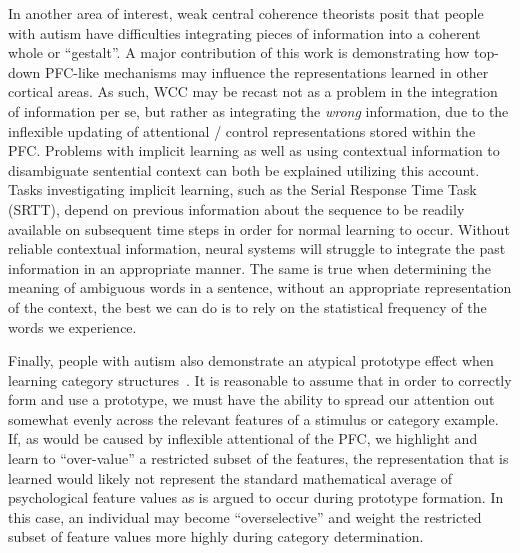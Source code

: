 \documentclass[man]{apa}
\begin{document}
In another area of interest, weak central coherence theorists posit that people with autism have difficulties integrating pieces of information into a coherent whole or ``gestalt''\cite{FrithU:1989:AutismWCC,HappeF:1999:WCC}.  A major contribution of this work is demonstrating how top-down PFC-like mechanisms may influence the representations learned in other cortical areas.  As such, WCC may be recast not as a problem in the integration of information per se, but rather as integrating the \emph{wrong} information, due to the inflexible updating of attentional / control representations stored within the PFC.   Problems with implicit learning as well as using contextual information to disambiguate sentential context can both be explained utilizing this account.  Tasks investigating implicit learning, such as the Serial Response Time Task (SRTT), depend on previous information about the sequence to be readily available on subsequent time steps in order for normal learning to occur.  Without reliable contextual information, neural systems will struggle to integrate the past information in an appropriate manner.  The same is true when determining the meaning of ambiguous words in a sentence, without an appropriate representation of the context, the best we can do is to rely on the statistical frequency of the words we experience.   

Finally, people with autism also demonstrate an atypical prototype effect when learning category structures~\cite{RefWorks:113,StraussMS:2009:Prototype}.   It is reasonable to assume that in order to correctly form and use a prototype, we must have the ability to spread our attention out somewhat evenly across the relevant features of a stimulus or category example.  If, as would be caused by inflexible attentional of the PFC, we highlight and learn to ``over-value'' a restricted subset of the features, the representation that is learned would likely not represent the standard mathematical average of psychological feature values as is argued to occur during prototype formation.  In this case, an individual may become ``overselective'' and weight the restricted subset of feature values more highly during category determination.  
\end{document}
